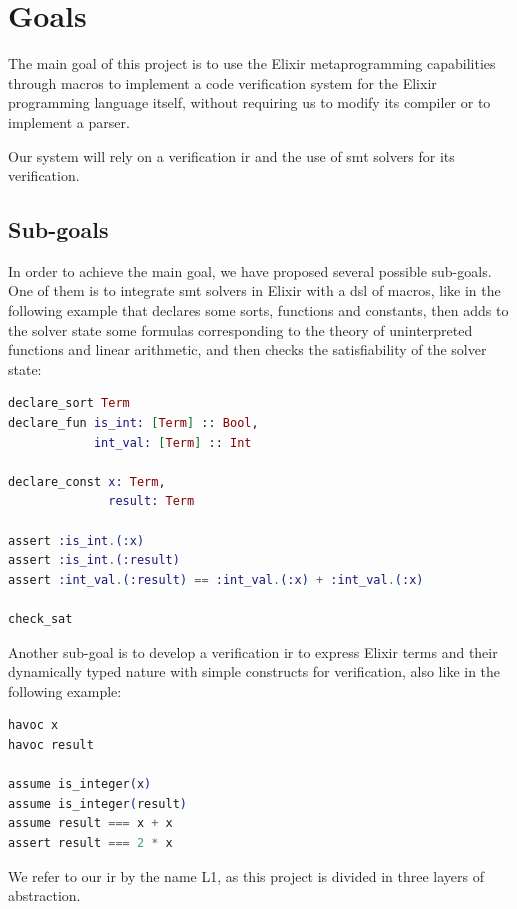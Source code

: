 \section{Goals}

The main goal of this project is to use the Elixir metaprogramming capabilities
through macros to implement a code verification system for the Elixir
programming language itself, without requiring us to modify its compiler or to
implement a parser.

Our system will rely on a verification \gls{ir} and the use of \acrshort{smt}
solvers for its verification.

\subsection{Sub-goals}

In order to achieve the main goal, we have proposed several possible sub-goals.
One of them is to integrate \acrshort{smt} solvers in Elixir with a \gls{dsl} of
macros, like in the following example that declares some sorts, functions and
constants, then adds to the solver state some formulas corresponding to the
theory of uninterpreted functions and linear arithmetic, and then checks the 
satisfiability of the solver state:

\begin{lstlisting}[language=elixir,numbers=none,frame=none]
declare_sort Term
declare_fun is_int: [Term] :: Bool,
            int_val: [Term] :: Int

declare_const x: Term, 
              result: Term

assert :is_int.(:x)
assert :is_int.(:result)
assert :int_val.(:result) == :int_val.(:x) + :int_val.(:x)

check_sat
\end{lstlisting}

Another sub-goal is to develop a verification \gls{ir} to express Elixir terms
and their dynamically typed nature with simple constructs for verification, also
like in the following example:

\begin{lstlisting}[language=elixir,numbers=none,frame=none]
havoc x
havoc result

assume is_integer(x)
assume is_integer(result)
assume result === x + x
assert result === 2 * x 
\end{lstlisting}

We refer to our \gls{ir} by the name L1, as this project is divided in three
layers of abstraction.

